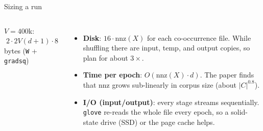 \documentclass[aspectratio=169,11pt]{beamer}
\begin{document}
\begin{frame}{Sizing a run}
\begin{columns}[c]
\centering
{}

{\scriptsize $V=400$k: $\;2\cdot 2V(d{+}1)\cdot 8$ bytes (\texttt{W} + \texttt{gradsq})}
\small
\begin{itemize}
  \item \textbf{Disk}: $16\cdot\mathrm{nnz}(X)$ for each co-occurrence file. While shuffling there are input, temp, and output copies, so plan for about $3\times$.
  \item \textbf{Time per epoch}: $O(\mathrm{nnz}(X)\cdot d)$. The paper finds that nnz grows sub-linearly in corpus size (about $|C|^{0.8}$).
  \item \textbf{I/O (input/output)}: every stage streams sequentially. \texttt{glove} re-reads the whole file every epoch, so a solid-state drive (SSD) or the page cache helps.
\end{itemize}
\end{columns}
\end{frame}
\end{document}
